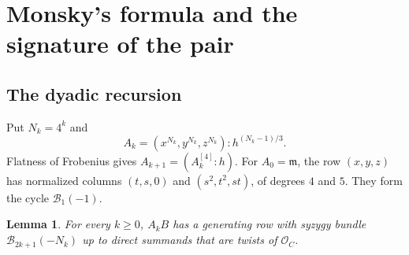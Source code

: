 \documentclass[11pt,a4paper,reqno]{amsart}
\numberwithin{equation}{section}
\theoremstyle{plain}
\newtheorem{lemma}[theorem]{Lemma}
\newcommand{\OO}{\mathcal O}
\newcommand{\Bcal}{\mathcal B}
\newcommand{\m}{\mathfrak m}
\begin{document}
\section{Monsky's formula and the signature of the pair}\label{sec:proof}

\subsection{The dyadic recursion}

Put $N_k=4^k$ and
\[
 A_k=(x^{N_k},y^{N_k},z^{N_k}):h^{(N_k-1)/3}.
\]
Flatness of Frobenius gives $A_{k+1}=(A_k^{[4]}:h)$. For $A_0=\m$, the row $(x,y,z)$ has normalized columns $(t,s,0)$ and $(s^2,t^2,st)$, of degrees $4$ and $5$. They form the cycle $\Bcal_1(-1)$.

\begin{lemma}\label{initial}
For every $k\ge0$, $A_kB$ has a generating row with syzygy bundle $\Bcal_{2k+1}(-N_k)$ up to direct summands that are twists of $\OO_C$.
\end{lemma}
\end{document}
